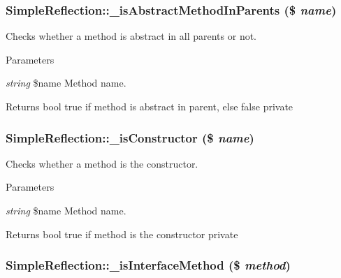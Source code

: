 \hypertarget{class_simple_reflection_ac9006131842cb26ec294640918828191}{
\subsubsection[{\_\-isAbstractMethodInParents}]{\setlength{\rightskip}{0pt plus 5cm}SimpleReflection::\_\-isAbstractMethodInParents (\$ {\em name})}}
\label{class_simple_reflection_ac9006131842cb26ec294640918828191}
Checks whether a method is abstract in all parents or not. 
\begin{DoxyParams}{Parameters}
\item[{\em string}]\$name Method name. \end{DoxyParams}
\begin{DoxyReturn}{Returns}
bool true if method is abstract in parent, else false  private 
\end{DoxyReturn}
\hypertarget{class_simple_reflection_a338c5377bd72a61a5664f3e7cf73514c}{
\subsubsection[{\_\-isConstructor}]{\setlength{\rightskip}{0pt plus 5cm}SimpleReflection::\_\-isConstructor (\$ {\em name})}}
\label{class_simple_reflection_a338c5377bd72a61a5664f3e7cf73514c}
Checks whether a method is the constructor. 
\begin{DoxyParams}{Parameters}
\item[{\em string}]\$name Method name. \end{DoxyParams}
\begin{DoxyReturn}{Returns}
bool true if method is the constructor  private 
\end{DoxyReturn}
\hypertarget{class_simple_reflection_abd74b1744a218f103d5d96ad95ce6f13}{
\subsubsection[{\_\-isInterfaceMethod}]{\setlength{\rightskip}{0pt plus 5cm}SimpleReflection::\_\-isInterfaceMethod (\$ {\em method})}}
